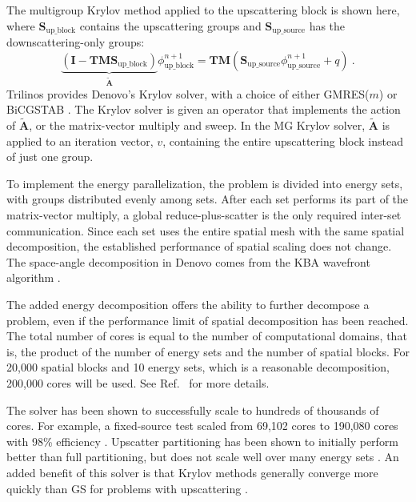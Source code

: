 \documentclass[preprint,12pt]{elsarticle}
\newcommand{\ve}[1]{\ensuremath{\mathbf{#1}}}
\begin{document}
The multigroup Krylov method applied to the upscattering block is shown here, where $\ve{S}_{\text{up\_block}}$ contains the upscattering groups and $\ve{S}_{\text{up\_source}}$ has the downscattering-only groups:
%
\begin{equation}
  \underbrace{(\ve{I} - \ve{TMS}_{\text{up\_block}})}_{\tilde{\ve{A}}}\phi_{\text{up\_block}}^{n+1} = \ve{TM}(\ve{S}_{\text{up\_source}}\phi_{\text{up\_source}}^{n+1} + q) \:.
  \label{eq:MGkrylov}
\end{equation}
%
Trilinos \cite{1089021} provides Denovo's Krylov solver, with a choice of either GMRES($m$) or BiCGSTAB \cite{Evans2010}. The Krylov solver is given an operator that implements the action of $\ve{\tilde{A}}$, or the matrix-vector multiply and sweep. In the MG Krylov solver, $\ve{\tilde{A}}$ is applied to an iteration vector, $v$, containing the entire upscattering block instead of just one group.%
%

To implement the energy parallelization, the problem is divided into energy sets, with groups distributed evenly among sets. After each set performs its part of the matrix-vector multiply, a global reduce-plus-scatter is the only required inter-set communication. Since each set uses the entire spatial mesh with the same spatial decomposition, the established performance of spatial scaling does not change. The space-angle decomposition in Denovo comes from the KBA wavefront algorithm \cite{Baker1998}. %

The added energy decomposition offers the ability to further decompose a problem, even if the performance limit of spatial decomposition has been reached. The total number of cores is equal to the number of computational domains, that is, the product of the number of energy sets and the number of spatial blocks. For 20,000 spatial blocks and 10 energy sets, which is a reasonable decomposition, 200,000 cores will be used. See Ref.\ \cite{Evans2011} for more details. 

The solver has been shown to successfully scale to hundreds of thousands of cores. For example, a fixed-source test scaled from 69,102 cores to 190,080 cores with 98\% efficiency \cite{Slaybaugh2011}. Upscatter partitioning has been shown to initially perform better than full partitioning, but does not scale well over many energy sets \cite{Davidson2014}. An added benefit of this solver is that Krylov methods generally converge more quickly than GS for problems with upscattering \cite{Trefethen1997}.
\end{document}
